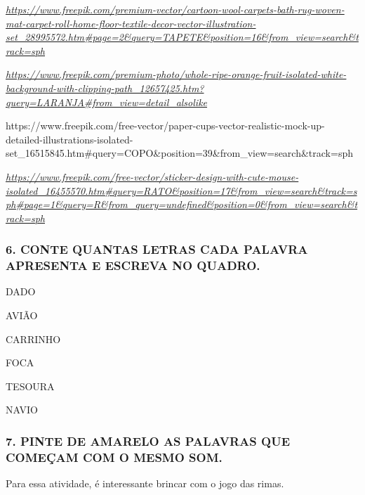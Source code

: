 \href{https://www.freepik.com/premium-vector/cartoon-wool-carpets-bath-rug-woven-mat-carpet-roll-home-floor-textile-decor-vector-illustration-set_28995572.htm\#page=2\&query=TAPETE\&position=16\&from_view=search\&track=sph}{\emph{https://www.freepik.com/premium-vector/cartoon-wool-carpets-bath-rug-woven-mat-carpet-roll-home-floor-textile-decor-vector-illustration-set\_28995572.htm\#page=2\&query=TAPETE\&position=16\&from\_view=search\&track=sph}}

\href{https://www.freepik.com/premium-photo/whole-ripe-orange-fruit-isolated-white-background-with-clipping-path_12657425.htm?query=LARANJA\#from_view=detail_alsolike}{\emph{https://www.freepik.com/premium-photo/whole-ripe-orange-fruit-isolated-white-background-with-clipping-path\_12657425.htm?query=LARANJA\#from\_view=detail\_alsolike}}

https://www.freepik.com/free-vector/paper-cups-vector-realistic-mock-up-detailed-illustrations-isolated-set\_16515845.htm\#query=COPO\&position=39\&from\_view=search\&track=sph

\href{https://www.freepik.com/free-vector/sticker-design-with-cute-mouse-isolated_16455570.htm\#query=RATO\&position=17\&from_view=search\&track=sph\#page=1\&query=R\&from_query=undefined\&position=0\&from_view=search\&track=sph}{\emph{https://www.freepik.com/free-vector/sticker-design-with-cute-mouse-isolated\_16455570.htm\#query=RATO\&position=17\&from\_view=search\&track=sph\#page=1\&query=R\&from\_query=undefined\&position=0\&from\_view=search\&track=sph}}

\subsubsection{6. CONTE QUANTAS LETRAS CADA PALAVRA APRESENTA E ESCREVA NO
QUADRO.}\label{conte-quantas-letras-tem-as-palavras-e-escreva-no-quadro.}

DADO

AVIÃO

CARRINHO

FOCA

TESOURA

NAVIO

\subsubsection{7. PINTE DE AMARELO AS PALAVRAS QUE COMEÇAM COM
O MESMO
SOM.}\label{pinte-de-amarelo-as-palavras-no-quadro-que-comeuxe7a-com-o-mesmo-som.}

Para essa atividade, é interessante brincar com o jogo das rimas.

